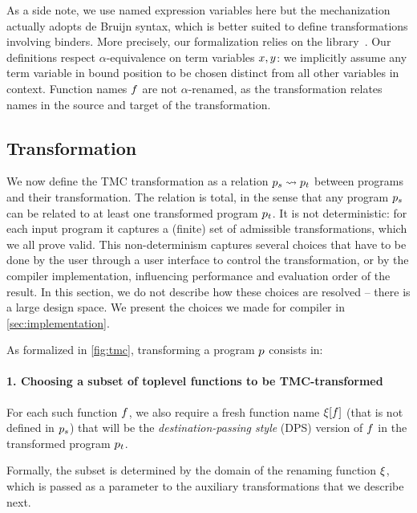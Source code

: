 As a side note, we use named expression variables here but the \Coq mechanization actually adopts de Bruijn syntax, which is better suited to define transformations involving binders.
More precisely, our formalization relies on the \Autosubst library~\cite{autosubst-2015}.
Our definitions respect $\alpha$-equivalence on term variables $\datalangVar, \datalangVarTwo$: we implicitly assume any term variable in bound position to be chosen distinct from all other variables in context.
Function names $\datalangFn$ are not $\alpha$-renamed, as the transformation relates names in the source and target of the transformation.

\subsection{Transformation}
\label{subsec:transformation}

We now define the TMC transformation as a relation $\datalangProg_s \tmc \datalangProg_t$ between programs and their transformation.
The relation is total, in the sense that any \DataLang program $\datalangProg_s$ can be related to at least one transformed program $\datalangProg_t$.
It is not deterministic: for each input program it captures a (finite) set of admissible transformations, which we all prove valid.
This non-determinism captures several choices that have to be done by the user through a user interface to control the transformation, or by the compiler implementation, influencing performance and evaluation order of the result.
In this section, we do not describe how these choices are resolved -- there is a large design space.
We present the choices we made for \OCaml compiler in \cref{sec:implementation}.

As formalized in \cref{fig:tmc}, transforming a \DataLang program $\datalangProg$ consists in:


\paragraph{1. Choosing a subset of toplevel functions to be TMC-transformed}
For each such function $\datalangFn$, we also require a fresh function name $\datalangRenaming [\datalangFn]$ (that is not defined in $\datalangProg_s$) that will be the \emph{destination-passing style} (DPS) version of $\datalangFn$ in the transformed program $\datalangProg_t$.

Formally, the subset is determined by the domain of the renaming function $\xi$, which is passed as a parameter to the auxiliary transformations that we describe next.

